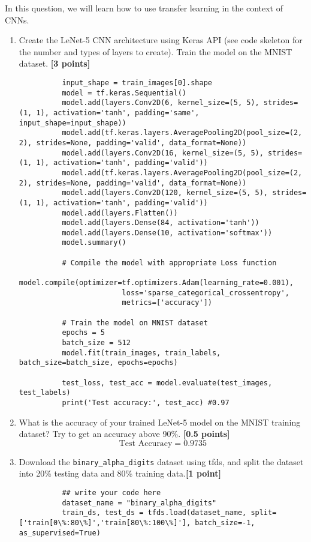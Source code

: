 \item In this question, we will learn how to use transfer learning in the context of CNNs.

\begin{enumerate}
  \item Create the LeNet-5 CNN architecture using Keras API (see code skeleton for the number
        and types of layers to create). Train the model on the MNIST dataset. {\bf [3 points]}
        \begin{lstlisting}
          input_shape = train_images[0].shape
          model = tf.keras.Sequential()
          model.add(layers.Conv2D(6, kernel_size=(5, 5), strides=(1, 1), activation='tanh', padding='same', input_shape=input_shape))
          model.add(tf.keras.layers.AveragePooling2D(pool_size=(2, 2), strides=None, padding='valid', data_format=None))
          model.add(layers.Conv2D(16, kernel_size=(5, 5), strides=(1, 1), activation='tanh', padding='valid'))
          model.add(tf.keras.layers.AveragePooling2D(pool_size=(2, 2), strides=None, padding='valid', data_format=None))
          model.add(layers.Conv2D(120, kernel_size=(5, 5), strides=(1, 1), activation='tanh', padding='valid'))
          model.add(layers.Flatten())
          model.add(layers.Dense(84, activation='tanh'))
          model.add(layers.Dense(10, activation='softmax'))
          model.summary()

          # Compile the model with appropriate Loss function
          model.compile(optimizer=tf.optimizers.Adam(learning_rate=0.001), 
                        loss='sparse_categorical_crossentropy',
                        metrics=['accuracy'])

          # Train the model on MNIST dataset
          epochs = 5
          batch_size = 512
          model.fit(train_images, train_labels, batch_size=batch_size, epochs=epochs)

          test_loss, test_acc = model.evaluate(test_images, test_labels)
          print('Test accuracy:', test_acc) #0.97
        \end{lstlisting}
  \item What is the accuracy of your trained LeNet-5 model on the MNIST training dataset? Try
        to get an accuracy above 90\%. {\bf [0.5 points]}
        $$\text{Test Accuracy} = 0.9735$$
  \item Download the \lstinline{binary_alpha_digits} dataset using tfds, and split the dataset into 20\%
        testing data and 80\% training data.{\bf [1 point]}
        \begin{lstlisting}
          ## write your code here
          dataset_name = "binary_alpha_digits"
          train_ds, test_ds = tfds.load(dataset_name, split=['train[0\%:80\%]','train[80\%:100\%]'], batch_size=-1, as_supervised=True)


\end{lstlisting}
\end{enumerate}
